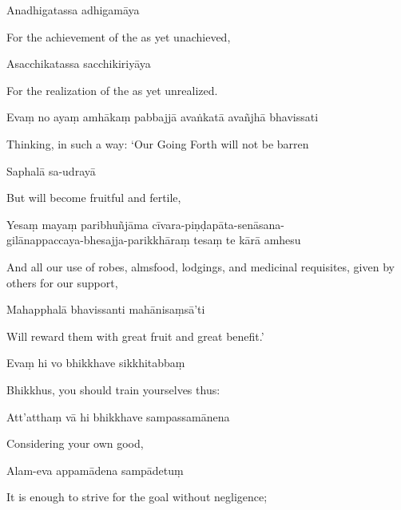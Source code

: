 Anadhigatassa adhigamāya

\begin{english}
  For the achievement of the as yet unachieved,
\end{english}

Asacchikatassa sacchikiriyāya

\begin{english}
  For the realization of the as yet unrealized.
\end{english}

Evaṃ no ayaṃ amhākaṃ pabbajjā avaṅkatā avañjhā bhavissati

\begin{english}
  Thinking, in such a way: `Our Going Forth will not be barren
\end{english}

Saphalā sa-udrayā

\begin{english}
  But will become fruitful and fertile,
\end{english}

Yesaṃ mayaṃ paribhuñjāma cīvara-piṇḍapāta-senāsana-\\
gilānappaccaya-bhesajja-parikkhāraṃ tesaṃ te kārā amhesu

\begin{english}
  And all our use of robes, almsfood, lodgings, and medicinal
  requisites, given by others for our support,
\end{english}

Mahapphalā bhavissanti mahānisaṃsā'ti

\begin{english}
  Will reward them with great fruit and great benefit.'
\end{english}

Evaṃ hi vo bhikkhave sikkhitabbaṃ

\begin{english}
  Bhikkhus, you should train yourselves thus:
\end{english}

Att'atthaṃ vā hi bhikkhave sampassamānena

\begin{english}
  Considering your own good,
\end{english}

Alam-eva appamādena sampādetuṃ

\begin{english}
  It is enough to strive for the goal without negligence;
\end{english}

